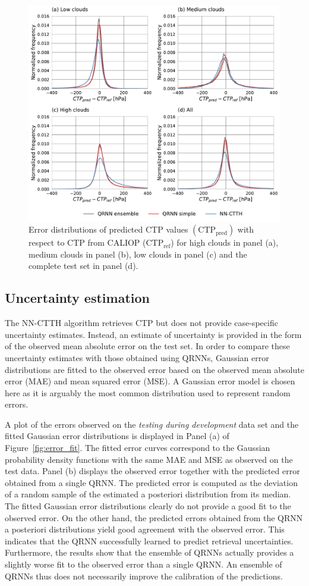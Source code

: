 \documentclass[journal abbreviation, manuscript]{copernicus}
\begin{document}
\begin{figure}[htbp!]
  \centering
  \includegraphics[width = 0.8\linewidth]{../plots/fig10}
  \caption{Error distributions of predicted CTP values $(\text{CTP}_{\text{pred}})$ 
    with respect to CTP from CALIOP ($\text{CTP}_{\text{ref}}$) for high clouds in
    panel (a), medium clouds in panel (b), low clouds in panel (c) and the
    complete test set in panel (d).}
  \label{fig:ctp_results}
\end{figure}

\subsection{Uncertainty estimation}

The NN-CTTH algorithm retrieves CTP but does not provide case-specific
uncertainty estimates. Instead, an estimate of uncertainty is provided in the
form of the observed mean absolute error on the test set. In order to compare
these uncertainty estimates with those obtained using QRNNs, Gaussian error
distributions are fitted to the observed error based on the observed mean
absolute error (MAE) and mean squared error (MSE). A Gaussian error model
is chosen here as it is arguably the most common distribution used to represent
random errors.

A plot of the errors observed on the \textit{testing during development} data
set and the fitted Gaussian error distributions is displayed in Panel (a) of
Figure~\ref{fig:error_fit}. The fitted error curves correspond to the Gaussian
probability density functions with the same MAE and MSE as observed on the test
data. Panel (b) displays the observed error together with the predicted error
obtained from a single QRNN. The predicted error is computed as the deviation of
a random sample of the estimated a posteriori distribution from its median. The
fitted Gaussian error distributions clearly do not provide a good fit to the
observed error. On the other hand, the predicted errors obtained from the QRNN a
posteriori distributions yield good agreement with the observed error. This
indicates that the QRNN successfully learned to predict retrieval uncertainties.
Furthermore, the results show that the ensemble of QRNNs actually provides a
slightly worse fit to the observed error than a single QRNN. An ensemble of
QRNNs thus does not necessarily improve the calibration of the predictions.
\end{document}
